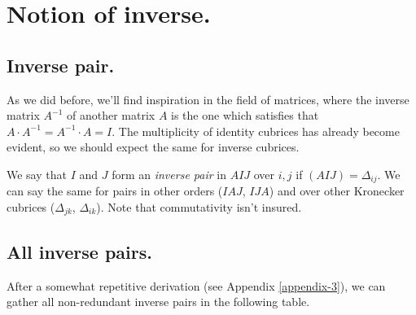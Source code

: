 \section{Notion of inverse.} \label{inverse}

\subsection{Inverse pair.} \label{inverse-pair}

As we did before, we'll find inspiration in the field of matrices, where the inverse matrix $A^{-1}$ of another matrix $A$ is the one which satisfies that ${A\cdot A^{-1} = A^{-1} \cdot A = I}$. The multiplicity of identity cubrices has already become evident, so we should expect the same for inverse cubrices.

We say that $I$ and $J$ form an \textit{inverse pair} in $AIJ$ over $i, j$ if $(AIJ) = \Delta_{ij}$. We can say the same for pairs in other orders ($IAJ$, $IJA$) and over other Kronecker cubrices ($\Delta_{jk}$, $\Delta_{ik}$). Note that commutativity isn't insured.

\subsection{All inverse pairs.} \label{inverse-all-pairs}

After a somewhat repetitive derivation (see Appendix \ref{appendix-3}), we can gather all non-redundant inverse pairs in the following table.

